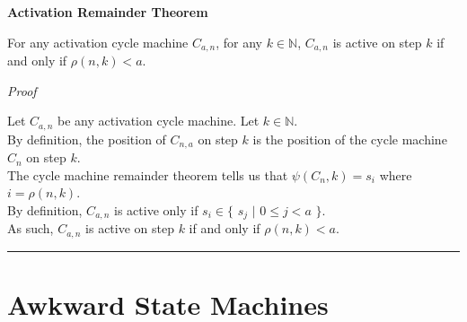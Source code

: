 \documentclass[a4paper,12pt]{article}
\begin{document}
\label{theorem:activation_remainder_theorem}
\hypertarget{theorem:activation_remainder_theorem}{}
\begin{tcolorbox}
\textbf{Activation Remainder Theorem}

\noindent For any activation cycle machine $C_{a, n}$, for any $k \in \mathbb{N}$,  $C_{a, n}$ is active on step $k$ if and only if $\rho(n, k) < a$.

\end{tcolorbox}

\noindent
\textit{Proof}

\noindent Let $C_{a, n}$ be any activation cycle machine. Let $k \in \mathbb{N}$.\\

\noindent By definition, the position of $C_{n,a}$ on step $k$ is the position of the cycle machine $C_n$ on step $k$.\\

\noindent The cycle machine remainder theorem tells us that $\psi(C_n, k) = s_i$ where $i = \rho(n, k)$.\\

\noindent By definition, $C_{a, n}$ is active only if $s_i \in \{$ $s_j$ $|$ $0 \leq j < a$ $\}$.\\

\noindent As such, $C_{a, n}$ is active on step $k$ if and only if $\rho(n, k) < a$.


\begin{center}
\noindent\rule{8cm}{0.4pt}
\end{center}





\section{Awkward State Machines}
\label{section:awkward_state_machines}
\hypertarget{section:awkward_state_machines}{}
\end{document}
